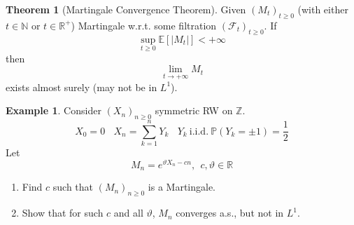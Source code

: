 \documentclass[10pt,a4paper]{article}
\theoremstyle{definition}
\newtheorem{exi}{Example}[section]
\newtheorem{teo}{Theorem}[section]
\begin{document}
\begin{teo}
	[Martingale Convergence Theorem] Given $( M_{t})_{t\geq 0}$ (with either $t\in \mathbb{N}$ or $t\in \mathbb{R}^{+}$) Martingale w.r.t. some filtration $(\mathcal{F}_{t})_{t\geq 0}$. If
	\begin{equation*}
		\sup _{t\geq 0}\mathbb{E}[| M_{t}| ] < +\infty 
	\end{equation*}
	then
	\begin{equation*}
		\lim\limits _{t\rightarrow +\infty } M_{t}
	\end{equation*}
	exists almost surely (may not be in $L^{1}$).
\end{teo}
\begin{exi}
	Consider $( X_{n})_{n\geq 0}$ symmetric RW on $\mathbb{Z}$.
	\begin{equation*}
		X_{0} =0\ \ \ \ X_{n} =\sum\limits _{k=1}^{n} Y_{k} \ \ \ \ Y_{k} \ \text{i.i.d.} \ \mathbb{P}( Y_{k} =\pm 1) =\frac{1}{2}
	\end{equation*}
	Let
	\begin{equation*}
		M_{n} =e^{\vartheta X_{n} -cn} ,\ \ c,\vartheta \in \mathbb{R}
	\end{equation*}
	\begin{enumerate}
		\item Find $c$ such that $( M_{n})_{n\geq 0}$ is a Martingale.
		\item Show that for such $c$ and all $\vartheta $, $M_{n}$ converges a.s., but not in $L^{1}$.
	\end{enumerate}




\end{exi}
\end{document}
